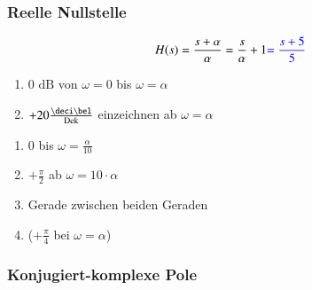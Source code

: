 \subsubsection{Reelle Nullstelle}

\begin{minipage}[t]{0.48\columnwidth}
    $$ H(s) = \frac{s + \alpha}{\alpha} = \frac{s}{\alpha} + 1 {\color{blue}= \frac{s + 5}{5}} $$
    
\end{minipage}
\hfill
\begin{minipage}[t]{0.48\columnwidth}

    \begin{enumerate}
        \item 0 $\text{dB}$ von $\omega=0$ bis $\omega=\alpha$
        \item $+20\frac{\deci \bel}{\Dek}$ einzeichnen ab $\omega = \alpha$
    \end{enumerate}

    \begin{enumerate}
        \item $0$ bis $\omega = \frac{\alpha}{10}$
        \item $+\frac{\pi}{2}$ ab $\omega = 10\cdot \alpha$
        \item Gerade zwischen beiden Geraden 
        \item ($+\frac{\pi}{4}$ bei $\omega=\alpha$)
    \end{enumerate}
\end{minipage}
    

\subsubsection{Konjugiert-komplexe Pole}

